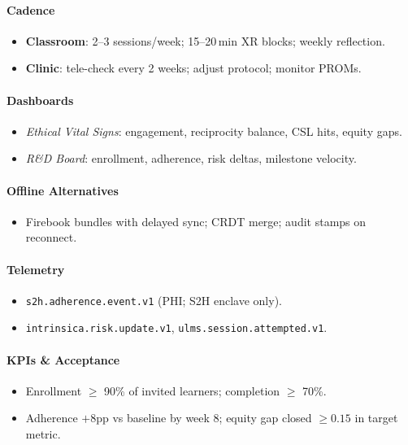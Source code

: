 \documentclass[11pt]{article}
\theoremstyle{plain}
\begin{document}
\paragraph{Cadence}
\begin{itemize}
  \item \textbf{Classroom}: 2--3 sessions/week; 15--20\,min XR blocks; weekly reflection.
  \item \textbf{Clinic}: tele-check every 2 weeks; adjust protocol; monitor PROMs.
\end{itemize}

\paragraph{Dashboards}
\begin{itemize}
  \item \emph{Ethical Vital Signs}: engagement, reciprocity balance, CSL hits, equity gaps.
  \item \emph{R\&D Board}: enrollment, adherence, risk deltas, milestone velocity.
\end{itemize}

\paragraph{Offline Alternatives}
\begin{itemize}
  \item Firebook bundles with delayed sync; CRDT merge; audit stamps on reconnect.
\end{itemize}

\paragraph{Telemetry}
\begin{itemize}
  \item \texttt{s2h.adherence.event.v1} (PHI; S2H enclave only).
  \item \texttt{intrinsica.risk.update.v1}, \texttt{ulms.session.attempted.v1}.
\end{itemize}

\paragraph{KPIs \& Acceptance}
\begin{itemize}
  \item Enrollment $\geq$ 90\% of invited learners; completion $\geq$ 70\%.
  \item Adherence $+8$pp vs baseline by week 8; equity gap closed $\geq 0.15$ in target metric.
\end{itemize}
\end{document}
